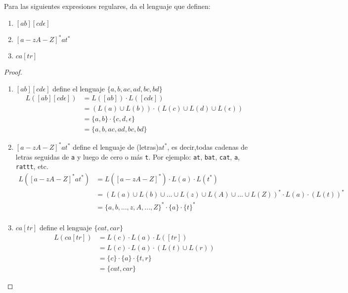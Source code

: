 \begin{Pro}
    Para las siguientes expresiones regulares, da el lenguaje que definen: 
    \begin{enumerate}
        \item $[ab][cd\epsilon]$ 
        \item $[a-zA-Z]^*at^*$
        \item $ca[tr]$
    \end{enumerate}
\end{Pro}
\begin{proof}
    \hspace{1cm}
    \begin{enumerate}
        \item $[ab][cd\epsilon]$ define el lenguaje $\{a,b,ac,ad,bc, bd\}$
        \begin{align*}
            L([ab][cd\epsilon]) &= L([ab]) \cdot L([cd\epsilon]) \\
            &=  ( L(a) \cup L(b) )\cdot (L(c) \cup L(d) \cup L(\epsilon)) \\
            &= \{a,b\} \cdot \{c,d,\epsilon\} \\
            &= \{a,b,ac,ad,bc,bd \}
        \end{align*}
        \item $[a-zA-Z]^*at^*$ define el lenguaje de (letras)a$t^*$, es decir,todas cadenas de letras seguidas de \texttt{a} y luego de cero o más \texttt{t}. Por ejemplo: \texttt{at}, \texttt{bat}, \texttt{cat}, \texttt{a}, \texttt{rattt}, etc.
        \begin{align*}
            L([a-zA-Z]^*at^*) &= L([a-zA-Z]^*) \cdot L(a) \cdot L(t^*) \\
            &= (L(a) \cup L(b) \cup ... \cup L(z) \cup L(A) \cup ... \cup L(Z))^* \cdot L(a) \cdot (L(t))^* \\
            &= \{  a, b, ..., z, A, ..., Z\}^* \cdot \{a\} \cdot  \{t\}^* \\
        \end{align*}
        \item $ca[tr]$ define el lenguaje $\{cat, car\}$
        \begin{align*}
            L(ca[tr]) &= L(c) \cdot L(a) \cdot L([tr]) \\
            &= L(c) \cdot L(a) \cdot (L(t) \cup L(r)) \\
            &= \{c\} \cdot \{a\} \cdot \{t, r\} \\
            &= \{cat, car\}
        \end{align*}
    \end{enumerate}
\end{proof}
\newpage